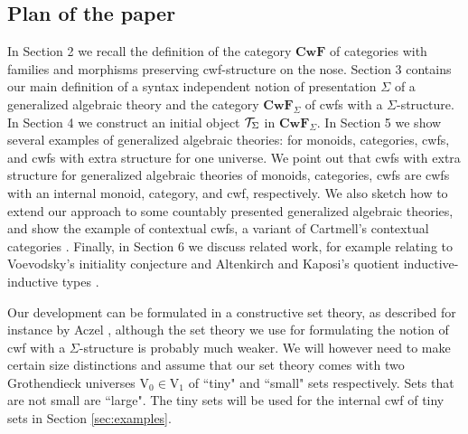 \documentclass{lmcs}
\newcommand{\FYI}[1]{{\color{red}#1}}
\def\V{\mathrm{V}}
\def\Cwf{\mathbf{CwF}}
\begin{document}

\subsection*{Plan of the paper}

In Section 2 we recall the definition of the category $\Cwf$ of categories with families and morphisms preserving cwf-structure on the nose. Section 3 contains our main definition of a syntax independent notion of \FYI{presentation} $\Sigma$ of a generalized algebraic theory and the category $\Cwf_\Sigma$ of cwfs with a $\Sigma$-structure. In Section 4 we construct an initial object ${\mathcal T}_\Sigma$ in $\Cwf_\Sigma$. In Section 5 we show several examples of generalized algebraic theories: for monoids, categories, cwfs, and cwfs with extra structure for one universe. We point out that cwfs with extra structure for generalized algebraic theories of monoids, categories, cwfs are cwfs with an internal monoid, category, and cwf, respectively. We also sketch how to extend our approach to some countably presented generalized algebraic theories, and show the example of contextual cwfs, a variant of Cartmell's contextual categories \cite{cartmell:phd,cartmell:apal}. Finally, in Section 6 we discuss related work, for example relating to Voevodsky's initiality conjecture \cite{voevodsky:initiality} and Altenkirch and Kaposi's quotient inductive-inductive types \cite{altenkirch:qiits}.

Our development can be formulated in a constructive set theory,
as described for instance by Aczel \cite{MR519801,aczel:relate}, although the set theory
we use for formulating the notion of cwf with a $\Sigma$-structure is probably
much weaker. We will however need to make certain size distinctions and assume that our set theory comes with two Grothendieck universes $\V_0 \in \V_1$ of ``tiny" and ``small" sets respectively. Sets that are not small are ``large". The tiny sets will be used for the internal cwf of tiny sets in Section \ref{sec:examples}.
\end{document}
